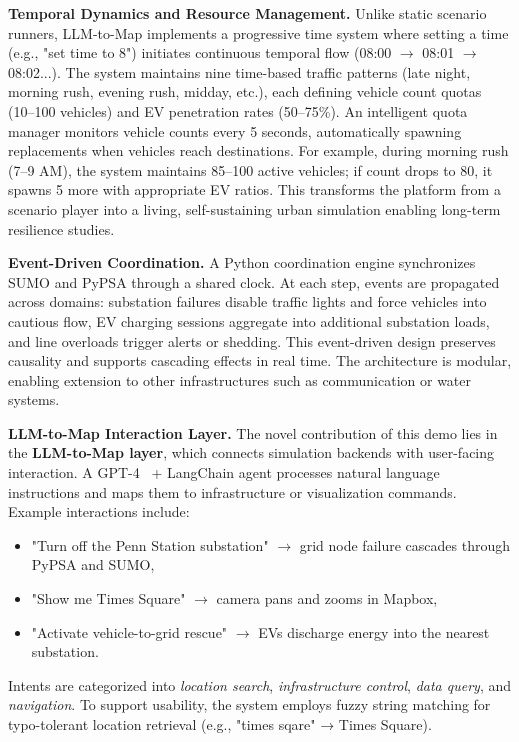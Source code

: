 \documentclass[sigconf,review,nonacm]{acmart}
\begin{document}
\noindent\textbf{Temporal Dynamics and Resource Management.}
Unlike static scenario runners, LLM-to-Map implements a progressive time system where setting a time (e.g., "set time to 8") initiates continuous temporal flow (08:00 $\rightarrow$ 08:01 $\rightarrow$ 08:02...). The system maintains nine time-based traffic patterns (late night, morning rush, evening rush, midday, etc.), each defining vehicle count quotas (10–100 vehicles) and EV penetration rates (50–75\%). An intelligent quota manager monitors vehicle counts every 5 seconds, automatically spawning replacements when vehicles reach destinations. For example, during morning rush (7–9 AM), the system maintains 85–100 active vehicles; if count drops to 80, it spawns 5 more with appropriate EV ratios. This transforms the platform from a scenario player into a living, self-sustaining urban simulation enabling long-term resilience studies.

\noindent\textbf{Event-Driven Coordination.}
A Python coordination engine synchronizes SUMO and PyPSA through a shared clock. At each step, events are propagated across domains: substation failures disable traffic lights and force vehicles into cautious flow, EV charging sessions aggregate into additional substation loads, and line overloads trigger alerts or shedding. This event-driven design preserves causality and supports cascading effects in real time. The architecture is modular, enabling extension to other infrastructures such as communication or water systems.

\noindent\textbf{LLM-to-Map Interaction Layer.}
The novel contribution of this demo lies in the \textbf{LLM-to-Map layer}, which connects simulation backends with user-facing interaction. A GPT-4~\cite{achiam2023gpt} + LangChain agent processes natural language instructions and maps them to infrastructure or visualization commands. Example interactions include:
\begin{itemize}
    \item "Turn off the Penn Station substation" $\rightarrow$ grid node failure cascades through PyPSA and SUMO,
    \item "Show me Times Square" $\rightarrow$ camera pans and zooms in Mapbox,
    \item "Activate vehicle-to-grid rescue" $\rightarrow$ EVs discharge energy into the nearest substation.
\end{itemize}
Intents are categorized into \emph{location search}, \emph{infrastructure control}, \emph{data query}, and \emph{navigation}. To support usability, the system employs fuzzy string matching for typo-tolerant location retrieval (e.g., "times sqare" → Times Square).
\end{document}
